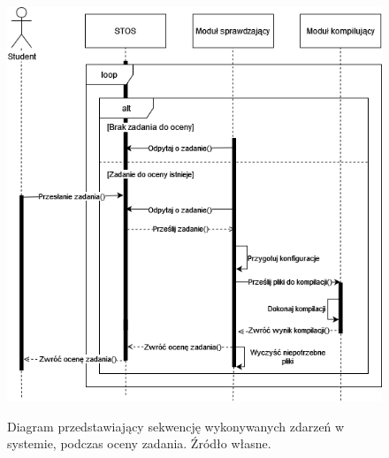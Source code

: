 \begin{figure}
	\begin{center}
		\resizebox{0.7\textwidth}{!} {
			\includegraphics{img/1/d_sek_1.png}
		}
		\caption[Diagram sekwencji komponentów]{Diagram przedstawiający sekwencję wykonywanych zdarzeń w systemie, podczas oceny zadania. Źródło własne.}
	\end{center}
\end{figure}
